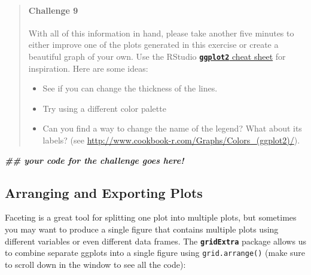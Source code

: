 \documentclass[
]{article}
\newenvironment{Shaded}{\begin{snugshade}}{\end{snugshade}}
\newcommand{\DocumentationTok}[1]{\textcolor[rgb]{0.56,0.35,0.01}{\textbf{\textit{#1}}}}
\providecommand{\tightlist}{%
  \setlength{\itemsep}{0pt}\setlength{\parskip}{0pt}}
\begin{document}
\begin{quote}
\mbox{}%
\hypertarget{challenge-9}{%
\paragraph{Challenge 9}\label{challenge-9}}

With all of this information in hand, please take another five minutes
to either improve one of the plots generated in this exercise or create
a beautiful graph of your own. Use the RStudio
\href{https://github.com/rstudio/cheatsheets/raw/master/data-visualization-2.1.pdf}{\textbf{\texttt{ggplot2}}
cheat sheet} for inspiration. Here are some ideas:

\begin{itemize}
\tightlist
\item
  See if you can change the thickness of the lines.
\item
  Try using a different color palette
\item
  Can you find a way to change the name of the legend? What about its
  labels? (see
  \url{http://www.cookbook-r.com/Graphs/Colors_(ggplot2)/}).
\end{itemize}
\end{quote}

\begin{Shaded}
\begin{Highlighting}[]
\DocumentationTok{\#\# your code for the challenge goes here!}
\end{Highlighting}
\end{Shaded}

\hypertarget{arranging-and-exporting-plots}{%
\subsection{Arranging and Exporting
Plots}\label{arranging-and-exporting-plots}}

Faceting is a great tool for splitting one plot into multiple plots, but
sometimes you may want to produce a single figure that contains multiple
plots using different variables or even different data frames. The
\textbf{\texttt{gridExtra}} package allows us to combine separate
ggplots into a single figure using \texttt{grid.arrange()} (make sure to
scroll down in the window to see all the code):
\end{document}
